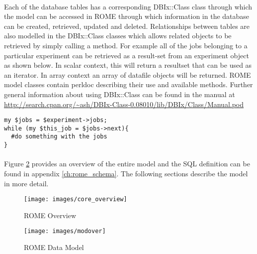 
\paragraph{}
Each of the database tables has a corresponding DBIx::Class class through which the model can be accessed in ROME through which information in the database can be created, retrieved, updated and deleted. Relationships between tables are also modelled in the DBIx::Class classes which allows related objects to be retrieved by simply calling a method. For example all of the jobs belonging to a particular experiment can be retrieved as a result-set from an experiment object as shown below. In scalar context, this will return a resultset that can be used as an iterator. In array context an array of datafile objects will be returned. ROME model classes contain perldoc describing their use and available methods. Further general information about using DBIx::Class can be found in the manual at \url{http://search.cpan.org/~ash/DBIx-Class-0.08010/lib/DBIx/Class/Manual.pod}

\begin{scriptsize}
\begin{verbatim}
my $jobs = $experiment->jobs;
while (my $this_job = $jobs->next){
  #do something with the jobs
}
\end{verbatim}
\end{scriptsize}



\paragraph{}
Figure \ref{fig:modover} provides an overview of the entire model and the SQL definition can be found in appendix \ref{ch:rome_schema}. The following sections describe the model in more detail.


\begin{figure}
\centering
\caption{ROME Overview}\label{fig:modover}
\texttt{[image: images/core\_overview]}
\end{figure}

\begin{figure}
\centering
\caption{ROME Data Model}\label{fig:modover}
\texttt{[image: images/modover]}
\end{figure}

\clearpage
